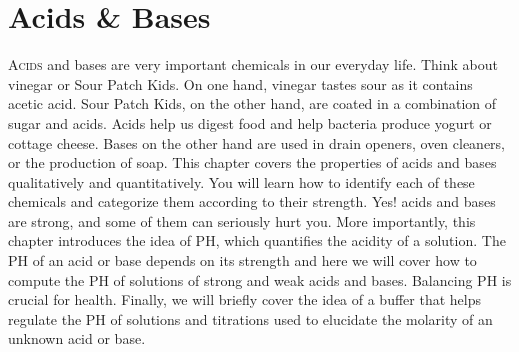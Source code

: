 \documentclass[main.tex]{subfiles}
\begin{document}
\chapter[Acids \& Bases ]{Acids \& Bases}


       \begin{marginfigure}
\end{marginfigure}



   
\lettrine[lines=4]{\color{black!45}A}{cids} and bases are very important chemicals in our everyday life. Think about vinegar or Sour Patch Kids. On one hand, vinegar tastes sour as it contains acetic acid. Sour Patch Kids, on the other hand, are coated in a combination of sugar and acids. Acids help us digest food and help bacteria produce yogurt or cottage cheese. Bases on the other hand are used in drain openers, oven cleaners, or the production of soap. This chapter covers the properties of acids and bases qualitatively and quantitatively. You will learn how to identify each of these chemicals and categorize them according to their strength. Yes! acids and bases are strong, and some of them can seriously hurt you. More importantly, this chapter introduces the idea of PH, which quantifies the acidity of a solution. The PH of an acid or base depends on its strength and here we will cover how to compute the PH of solutions of strong and weak acids and bases. Balancing PH is crucial for health. Finally, we will briefly cover the idea of a buffer that helps regulate the PH of solutions and titrations used to elucidate the molarity of an unknown acid or base.
\end{document}
